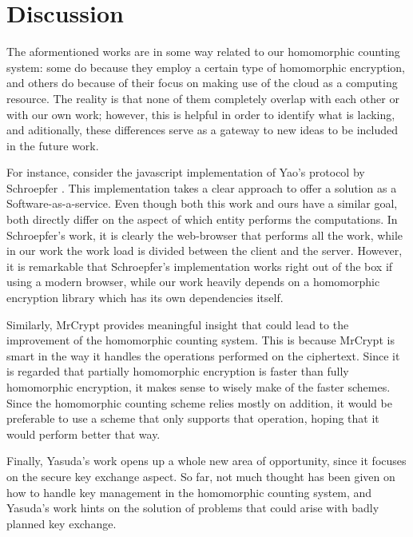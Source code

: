 \section{Discussion}

The aformentioned works are in some way related to our homomorphic counting system: some do because they employ a certain type of homomorphic encryption, and others do because of their focus on making use of the cloud as a computing resource. The reality is that none of them completely overlap with each other or with our own work; however, this is helpful in order to identify what is lacking, and aditionally, these differences serve as a gateway to new ideas to be included in the future work.

For instance, consider the javascript implementation of Yao's \cite{Yao:1986:GES:1382439.1382944} protocol by Schroepfer \cite{Schroepfer:2011:DSC:2046707.2093509}. This implementation takes a clear approach to offer a solution as a Software-as-a-service. Even though both this work and ours have a similar goal, both directly differ on the aspect of which entity performs the computations. In Schroepfer's work, it is clearly the web-browser that performs all the work, while in our work the work load is divided between the client and the server. However, it is remarkable that Schroepfer's implementation works right out of the box if using a modern browser, while our work heavily depends on a homomorphic encryption library which has its own dependencies itself.

Similarly, MrCrypt \cite{Tetali:2013:MSA:2544173.2509554} provides meaningful insight that could lead to the improvement of the homomorphic counting system. This is because MrCrypt is smart in the way it handles the operations performed on the ciphertext. Since it is regarded that partially homomorphic encryption is faster than fully homomorphic encryption, it makes sense to wisely make of the faster schemes. Since the homomorphic counting scheme relies mostly on addition, it would be preferable to use a scheme that only supports that operation, hoping that it would perform better that way.

Finally, Yasuda's \cite{Yasuda:2015:SDD:2732516.2732521} work opens up a whole new area of opportunity, since it focuses on the secure key exchange aspect. So far, not much thought has been given on how to handle key management in the homomorphic counting system, and Yasuda's work hints on the solution of problems that could arise with badly planned key exchange.

\clearpage
